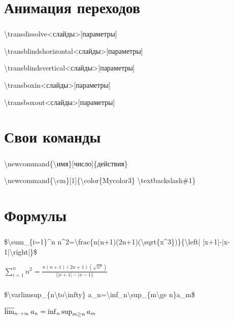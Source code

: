 \documentclass[russian, 14pt]{beamer}
\newcommand{\cm}[1]{{\color{Mycolor3}\textbackslash#1}}
\begin{document}
\section{Анимация переходов}

\begin{frame}
	\frametitle{\insertsection}
	\begin{block}{}
		\cm{transdissolve}<слайды>[параметры]
		
		
		\cm{transblindshorizontal}<слайды>[параметры]
		
		
		\cm{transblindsvertical}<слайды>[параметры]
		
		
		\cm{transboxin}<слайды>[параметры]
		
		
		\cm{transboxout}<слайды>[параметры]
	\end{block}
\end{frame}

\section{Свои команды}

\begin{frame}
	\frametitle{\insertsection}
	\begin{block}{}
		\cm{newcommand}\{\textbackslash имя\}[число]\{действия\}
	\end{block}
	\begin{block}{}
		\cm{newcommand}\{\textbackslash cm\}[1]\{\cm{color}\{Mycolor3\}
		\cm{textbackslash}\#1\}
	\end{block}
\end{frame}

\section{Формулы}

\begin{frame}
	\frametitle{\insertsection}
	\begin{block}{}
		\$\cm{sum}\_\{i=1\}\string^n n\string^2=\cm{frac}\{n(n+1)(2n+1)(\cm{sqrt}\{x\string^3\})\}\{\cm{left}| |x+1|-|x-1|\cm{right}|\}\$
	\end{block}
	\LARGE$\sum_{i=1}^n n^2=\frac{n(n+1)(2n+1)(\sqrt{x^3})}{\left| |x+1|-|x-1|\right|}$
\end{frame}

\begin{frame}
	\frametitle{\insertsection}
	\begin{block}{}
		\$\cm{varlimsup}\_\{n\cm{to}\cm{infty}\}
		a\_n=\cm{inf}\_n\cm{sup}\_\{m\cm{ge} n\}a\_m\$
	\end{block}
		\LARGE$\varlimsup_{n\to\infty}
a_n=\inf_n\sup_{m\ge n}a_m$
\end{frame}
\end{document}
